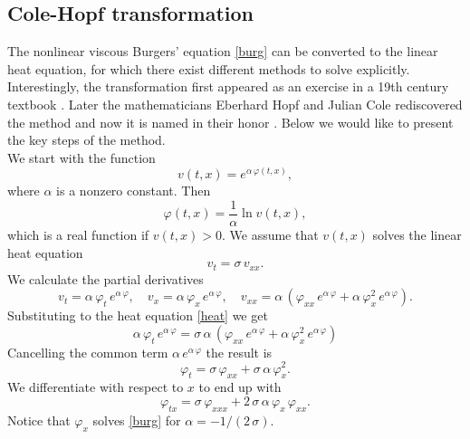 \documentclass[../include.tex]{subfiles}
\begin{document}
\subsection{Cole-Hopf transformation}
The nonlinear viscous Burgers' equation \eqref{burg} can be converted to the linear heat equation, for which there exist different methods to solve explicitly. Interestingly, the transformation first appeared as an exercise in a 19th century textbook \cite{olv, forsyth}. Later the mathematicians Eberhard Hopf \cite{hopf} and Julian Cole \cite{cole} rediscovered the method and now it is named in their honor \cite{olv}. Below we would like to present the key steps of the method.\\
We start with the function
\begin{equation}
	v(t, x) = e^{\alpha\, \varphi(t, x)},
	\label{expheat}
\end{equation}
where $ \alpha $ is a nonzero constant. Then
\[
\varphi(t, x) = \frac{1}{\alpha} \ln v(t, x),
\]
which is a real function if $ v(t, x) > 0 $. We assume that $ v(t, x) $ solves the linear heat equation
\begin{equation}
	v_t = \sigma\, v_{xx}.
	\label{heat}
\end{equation}
We calculate the partial derivatives
\[
v_t = \alpha\, \varphi_t\, e^{\alpha\, \varphi}, \quad 
v_x = \alpha\, \varphi_x\, e^{\alpha\, \varphi}, \quad
v_{xx} = \alpha\, (\varphi_{xx}\, e^{\alpha\, \varphi} + \alpha\, \varphi_x^2\, e^{\alpha\, \varphi}).
\]
Substituting to the heat equation \eqref{heat} we get
\[
\alpha\, \varphi_t\, e^{\alpha\, \varphi} = \sigma\, \alpha\, (\varphi_{xx}\, e^{\alpha\, \varphi} + \alpha\, \varphi_x^2\, e^{\alpha\, \varphi})
\]
Cancelling the common term $ \alpha\, e^{\alpha\,\varphi} $ the result is
\begin{equation}
	\varphi_t = \sigma\,\varphi_{xx} + \sigma\, \alpha\, \varphi_x^2.
	\label{potential_Burgers}
\end{equation}
We differentiate with respect to $ x $ to end up with
\[
\varphi_{tx} = \sigma\,\varphi_{xxx} + 2\, \sigma\, \alpha\, \varphi_x \,\varphi_{xx}.
\]
Notice that $ \varphi_x $ solves \eqref{burg} for $ \alpha = -1/(2\,\sigma) $.
\end{document}
